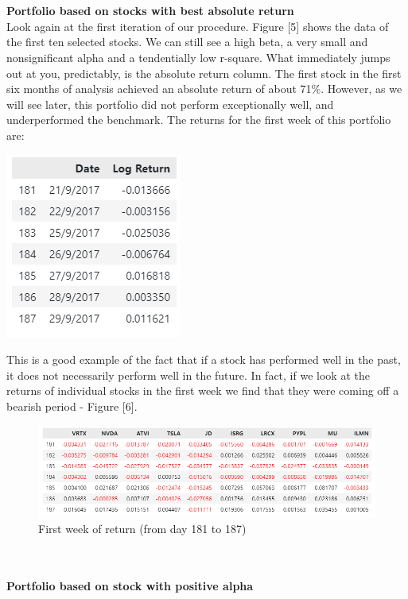 \documentclass[twocolumn]{article}
\begin{document}
\\\\
\textbf{Portfolio based on stocks with best absolute return}\\
Look again at the first iteration of our procedure. Figure [5] shows the data of the first ten selected stocks. We can still see a high beta, a very small and nonsignificant alpha and a tendentially low r-square. What immediately jumps out at you, predictably, is the absolute return column. The first stock in the first six months of analysis achieved an absolute return of about 71\%. However, as we will see later, this portfolio did not perform exceptionally well, and underperformed the benchmark. The returns for the first week of this portfolio are:
\begin{center}
\includegraphics[scale=0.6]{absolutereturnfirstweek.png}
\end{center}
This is a good example of the fact that if a stock has performed well in the past, it does not necessarily perform well in the future. In fact, if we look at the returns of individual stocks in the first week we find that they were coming off a bearish period - Figure [6].
\begin{figure}[t]
\centering\includegraphics[scale=0.5]{bearishfirstweek.png}
\caption{First week of return (from day 181 to 187)}
\end{figure}
\\\\
\textbf{Portfolio based on stock with positive alpha}\\
\end{document}
